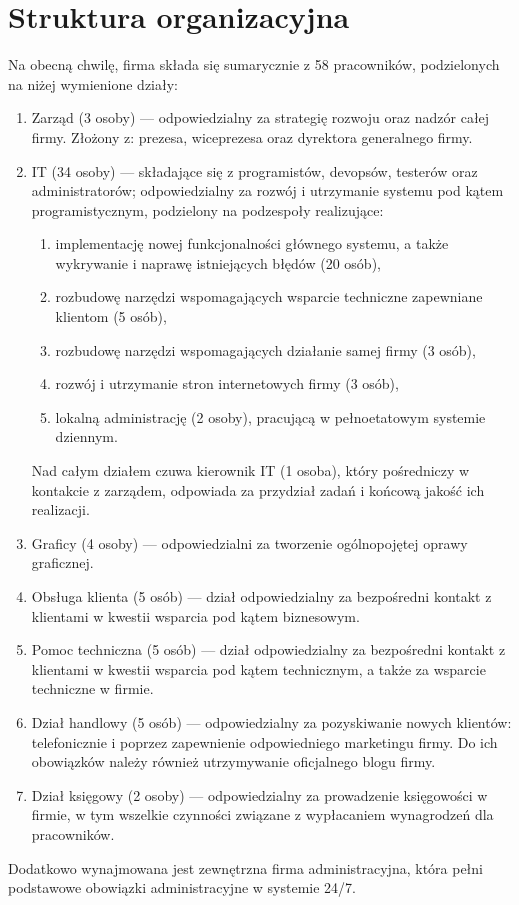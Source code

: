 \documentclass{article}
\begin{document}
    \section{Struktura organizacyjna}
        Na obecną chwilę, firma składa się sumarycznie z 58 pracowników, podzielonych na niżej wymienione działy:
        \begin{enumerate}
            \item Zarząd (3 osoby) --- odpowiedzialny za strategię rozwoju oraz nadzór całej firmy. Złożony z: prezesa, wiceprezesa oraz dyrektora generalnego firmy.
            \item IT (34 osoby) --- składające się z programistów, devopsów, testerów oraz administratorów; odpowiedzialny za rozwój i utrzymanie systemu pod kątem programistycznym, podzielony na podzespoły realizujące:
            \begin{enumerate}
                \item implementację nowej funkcjonalności głównego systemu, a także wykrywanie i naprawę istniejących błędów (20 osób),
                \item rozbudowę narzędzi wspomagających wsparcie techniczne zapewniane klientom (5 osób),
                \item rozbudowę narzędzi wspomagających działanie samej firmy (3 osób),
                \item rozwój i utrzymanie stron internetowych firmy (3 osób),
                \item lokalną administrację (2 osoby), pracującą w pełnoetatowym systemie dziennym.
            \end{enumerate}
            Nad całym działem czuwa kierownik IT (1 osoba), który pośredniczy w kontakcie z zarządem, odpowiada za przydział zadań i końcową jakość ich realizacji.
            \item Graficy (4 osoby) --- odpowiedzialni za tworzenie ogólnopojętej oprawy graficznej.
            \item Obsługa klienta (5 osób) --- dział odpowiedzialny za bezpośredni kontakt z klientami w kwestii wsparcia pod kątem biznesowym.
            \item Pomoc techniczna (5 osób) --- dział odpowiedzialny za bezpośredni kontakt z klientami w kwestii wsparcia pod kątem technicznym, a także za wsparcie techniczne w firmie.
            \item Dział handlowy (5 osób) --- odpowiedzialny za pozyskiwanie nowych klientów: telefonicznie i poprzez zapewnienie odpowiedniego marketingu firmy. Do ich obowiązków należy również utrzymywanie oficjalnego blogu firmy.
            \item Dział księgowy (2 osoby) --- odpowiedzialny za prowadzenie księgowości w firmie, w tym wszelkie czynności związane z wypłacaniem wynagrodzeń dla pracowników.
        \end{enumerate}
        Dodatkowo wynajmowana jest zewnętrzna firma administracyjna, która pełni podstawowe obowiązki administracyjne w systemie 24/7.
\end{document}
